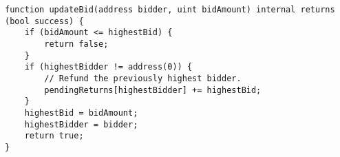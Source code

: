 \begin{lstlisting}[language=Solidity]
function updateBid(address bidder, uint bidAmount) internal returns (bool success) {
	if (bidAmount <= highestBid) {
		return false;
	}
	if (highestBidder != address(0)) {
		// Refund the previously highest bidder.
		pendingReturns[highestBidder] += highestBid;
	}
	highestBid = bidAmount;
	highestBidder = bidder;
	return true;
}
\end{lstlisting}